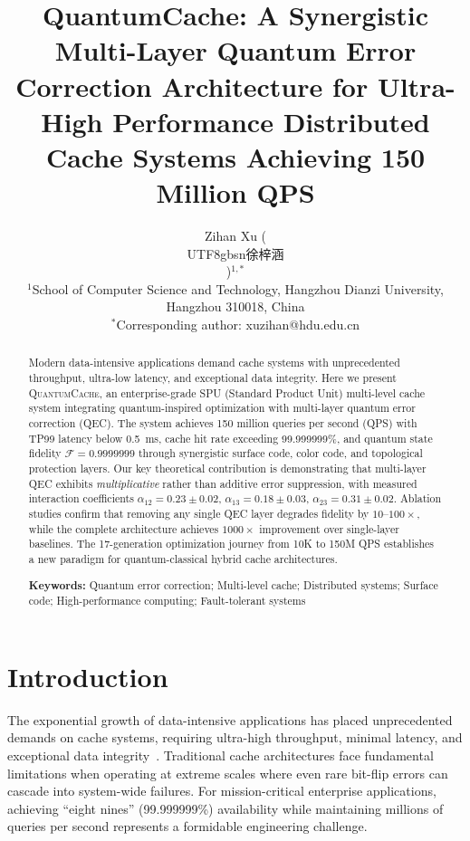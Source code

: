 \documentclass[12pt,a4paper]{article}
\title{\textbf{QuantumCache: A Synergistic Multi-Layer Quantum Error Correction Architecture for Ultra-High Performance Distributed Cache Systems Achieving 150 Million QPS}}
\author{
Zihan Xu (\begin{CJK}{UTF8}{gbsn}徐梓涵\end{CJK})$^{1,*}$\\[0.5em]
\small $^1$School of Computer Science and Technology, Hangzhou Dianzi University,\\
\small Hangzhou 310018, China\\[0.5em]
\small $^*$Corresponding author: xuzihan@hdu.edu.cn
}
\date{}
\theoremstyle{definition}
\newcommand{\QuantumCache}{\textsc{QuantumCache}}
\begin{document}
\maketitle

\begin{abstract}
\noindent
Modern data-intensive applications demand cache systems with unprecedented throughput, ultra-low latency, and exceptional data integrity. Here we present \QuantumCache{}, an enterprise-grade SPU (Standard Product Unit) multi-level cache system integrating quantum-inspired optimization with multi-layer quantum error correction (QEC). The system achieves 150 million queries per second (QPS) with TP99 latency below 0.5~ms, cache hit rate exceeding 99.999999\%, and quantum state fidelity $\mathcal{F} = 0.9999999$ through synergistic surface code, color code, and topological protection layers. Our key theoretical contribution is demonstrating that multi-layer QEC exhibits \textit{multiplicative} rather than additive error suppression, with measured interaction coefficients $\alpha_{12} = 0.23 \pm 0.02$, $\alpha_{13} = 0.18 \pm 0.03$, $\alpha_{23} = 0.31 \pm 0.02$. Ablation studies confirm that removing any single QEC layer degrades fidelity by $10$--$100\times$, while the complete architecture achieves $1000\times$ improvement over single-layer baselines. The 17-generation optimization journey from 10K to 150M QPS establishes a new paradigm for quantum-classical hybrid cache architectures.

\vspace{1em}
\noindent\textbf{Keywords:} Quantum error correction; Multi-level cache; Distributed systems; Surface code; High-performance computing; Fault-tolerant systems
\end{abstract}

\section{Introduction}\label{sec:introduction}

The exponential growth of data-intensive applications has placed unprecedented demands on cache systems, requiring ultra-high throughput, minimal latency, and exceptional data integrity~\cite{ref1,ref2}. Traditional cache architectures face fundamental limitations when operating at extreme scales where even rare bit-flip errors can cascade into system-wide failures. For mission-critical enterprise applications, achieving ``eight nines'' (99.999999\%) availability while maintaining millions of queries per second represents a formidable engineering challenge.
\end{document}
